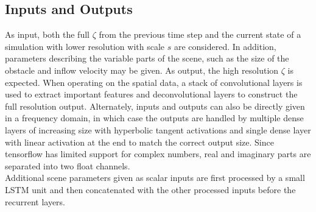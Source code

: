 \documentclass[sigconf]{acmart}
\begin{document}
\subsection{Inputs and Outputs}
As input, both the full $\zeta$ from the previous time step and the current state of a simulation with lower resolution with scale $s$ are considered. 
In addition, parameters describing the variable parts of the scene, such as the size of the obstacle and inflow velocity may be given.
As output, the high resolution $\zeta$ is expected.
When operating on the spatial data, a stack of convolutional layers is used to extract important features and deconvolutional layers to construct the full resolution output. Alternately, inputs and outputs can also be directly given in a frequency domain, in which case the outputs are handled by multiple dense layers of increasing size with hyperbolic tangent activations and single dense layer with linear activation at the end to match the correct output size.
Since tensorflow has limited support for complex numbers, real and imaginary parts are separated into two float channels. \\
Additional scene parameters given as scalar inputs are first processed by a small LSTM unit and then concatenated with the other processed inputs before the recurrent layers.
\end{document}
